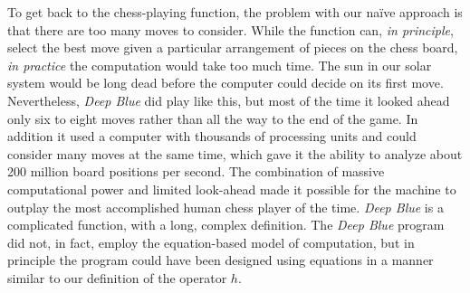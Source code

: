 To get back to the chess-playing function, the problem with our
na\"ive approach is that there are too many moves to consider.
While the function can, \emph{in principle},
select the best move given a particular arrangement of pieces on the chess board,
\emph{in practice} the computation
would take too much time.
The sun in our solar system would be long dead
before the computer could decide on its first move.
Nevertheless, \textit{Deep Blue}
did play like this, but most of the time it looked ahead
only six to eight moves rather than
all the way to the end of the game.
In addition it used a computer with thousands of processing units
and could consider many moves at the same time, which gave it
the ability to analyze about 200 million board positions per second.
The combination of massive computational power and limited look-ahead
made it possible for the machine to outplay the most accomplished human chess player of the time.
\textit{Deep Blue} is a complicated function, with a long, complex definition.
The \textit{Deep Blue} program did not, in fact,
employ the equation-based model of computation,
but in principle the program could have been designed
using equations in a manner similar to our definition of the operator $h$.

